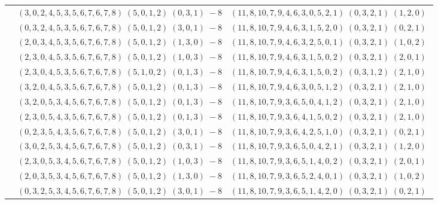 \documentclass[11pt]{article}
\begin{document}
\begin{longtable}[l]{|c|c|c|}
 \cline{2-3} 
 & $(3 ,0 ,2 ,4 ,5 ,3 ,5 ,6 ,7 ,6 ,7 ,8) \;(5 ,0 ,1 ,2) \;(0 ,3 ,1) \;-8$ & $(11 ,8 ,10 ,7 ,9 ,4 ,6 ,3 ,0 ,5 ,2 ,1) \;(0 ,3 ,2 ,1) \;(1 ,2 ,0) \;$\\ 
 \cline{2-3} 
 & $(0 ,3 ,2 ,4 ,5 ,3 ,5 ,6 ,7 ,6 ,7 ,8) \;(5 ,0 ,1 ,2) \;(3 ,0 ,1) \;-8$ & $(11 ,8 ,10 ,7 ,9 ,4 ,6 ,3 ,1 ,5 ,2 ,0) \;(0 ,3 ,2 ,1) \;(0 ,2 ,1) \;$\\ 
 \cline{2-3} 
 & $(2 ,0 ,3 ,4 ,5 ,3 ,5 ,6 ,7 ,6 ,7 ,8) \;(5 ,0 ,1 ,2) \;(1 ,3 ,0) \;-8$ & $(11 ,8 ,10 ,7 ,9 ,4 ,6 ,3 ,2 ,5 ,0 ,1) \;(0 ,3 ,2 ,1) \;(1 ,0 ,2) \;$\\ 
 \cline{2-3} 
 & $(2 ,3 ,0 ,4 ,5 ,3 ,5 ,6 ,7 ,6 ,7 ,8) \;(5 ,0 ,1 ,2) \;(1 ,0 ,3) \;-8$ & $(11 ,8 ,10 ,7 ,9 ,4 ,6 ,3 ,1 ,5 ,0 ,2) \;(0 ,3 ,2 ,1) \;(2 ,0 ,1) \;$\\ 
 \cline{2-3} 
 & $(2 ,3 ,0 ,4 ,5 ,3 ,5 ,6 ,7 ,6 ,7 ,8) \;(5 ,1 ,0 ,2) \;(0 ,1 ,3) \;-8$ & $(11 ,8 ,10 ,7 ,9 ,4 ,6 ,3 ,1 ,5 ,0 ,2) \;(0 ,3 ,1 ,2) \;(2 ,1 ,0) \;$\\ 
 \cline{2-3} 
 & $(3 ,2 ,0 ,4 ,5 ,3 ,5 ,6 ,7 ,6 ,7 ,8) \;(5 ,0 ,1 ,2) \;(0 ,1 ,3) \;-8$ & $(11 ,8 ,10 ,7 ,9 ,4 ,6 ,3 ,0 ,5 ,1 ,2) \;(0 ,3 ,2 ,1) \;(2 ,1 ,0) \;$\\ 
 \cline{2-3} 
 & $(3 ,2 ,0 ,5 ,3 ,4 ,5 ,6 ,7 ,6 ,7 ,8) \;(5 ,0 ,1 ,2) \;(0 ,1 ,3) \;-8$ & $(11 ,8 ,10 ,7 ,9 ,3 ,6 ,5 ,0 ,4 ,1 ,2) \;(0 ,3 ,2 ,1) \;(2 ,1 ,0) \;$\\ 
 \cline{2-3} 
 & $(2 ,3 ,0 ,5 ,4 ,3 ,5 ,6 ,7 ,6 ,7 ,8) \;(5 ,0 ,1 ,2) \;(0 ,1 ,3) \;-8$ & $(11 ,8 ,10 ,7 ,9 ,3 ,6 ,4 ,1 ,5 ,0 ,2) \;(0 ,3 ,2 ,1) \;(2 ,1 ,0) \;$\\ 
 \cline{2-3} 
 & $(0 ,2 ,3 ,5 ,4 ,3 ,5 ,6 ,7 ,6 ,7 ,8) \;(5 ,0 ,1 ,2) \;(3 ,0 ,1) \;-8$ & $(11 ,8 ,10 ,7 ,9 ,3 ,6 ,4 ,2 ,5 ,1 ,0) \;(0 ,3 ,2 ,1) \;(0 ,2 ,1) \;$\\ 
 \cline{2-3} 
 & $(3 ,0 ,2 ,5 ,3 ,4 ,5 ,6 ,7 ,6 ,7 ,8) \;(5 ,0 ,1 ,2) \;(0 ,3 ,1) \;-8$ & $(11 ,8 ,10 ,7 ,9 ,3 ,6 ,5 ,0 ,4 ,2 ,1) \;(0 ,3 ,2 ,1) \;(1 ,2 ,0) \;$\\ 
 \cline{2-3} 
 & $(2 ,3 ,0 ,5 ,3 ,4 ,5 ,6 ,7 ,6 ,7 ,8) \;(5 ,0 ,1 ,2) \;(1 ,0 ,3) \;-8$ & $(11 ,8 ,10 ,7 ,9 ,3 ,6 ,5 ,1 ,4 ,0 ,2) \;(0 ,3 ,2 ,1) \;(2 ,0 ,1) \;$\\ 
 \cline{2-3} 
 & $(2 ,0 ,3 ,5 ,3 ,4 ,5 ,6 ,7 ,6 ,7 ,8) \;(5 ,0 ,1 ,2) \;(1 ,3 ,0) \;-8$ & $(11 ,8 ,10 ,7 ,9 ,3 ,6 ,5 ,2 ,4 ,0 ,1) \;(0 ,3 ,2 ,1) \;(1 ,0 ,2) \;$\\ 
 \cline{2-3} 
 & $(0 ,3 ,2 ,5 ,3 ,4 ,5 ,6 ,7 ,6 ,7 ,8) \;(5 ,0 ,1 ,2) \;(3 ,0 ,1) \;-8$ & $(11 ,8 ,10 ,7 ,9 ,3 ,6 ,5 ,1 ,4 ,2 ,0) \;(0 ,3 ,2 ,1) \;(0 ,2 ,1) \;$\\ 

\end{longtable}
\end{document}
